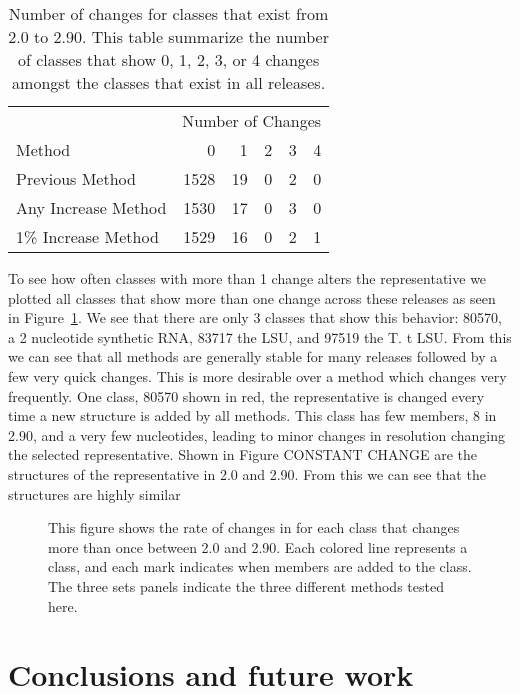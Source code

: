 \begin{table}
  \begin{tabular}{lrrrrr}
    \toprule
                        & \multicolumn{5}{c}{Number of Changes} \\
    Method              & 0    & 1  &  2 &  3 &  4 \\
    \midrule
    Previous Method     & 1528 & 19 &  0 &  2 &  0 \\
    Any Increase Method & 1530 & 17 &  0 &  3 &  0 \\
    1\% Increase Method & 1529 & 16 &  0 &  2 &  1 \\
    \bottomrule
  \end{tabular}
  \caption{Number of changes for classes that exist from 2.0 to 2.90. This table
    summarize the number of classes that show 0, 1, 2, 3, or 4 changes amongst
  the classes that exist in all releases. }
  \label{tab:rep-changes-count}
\end{table}

To see how often classes with more than 1 change alters the representative we
plotted all classes that show more than one change across these releases as seen
in Figure~\ref{fig:multi-change}. We see that there are only 3 classes that show
this behavior: 80570, a 2 nucleotide synthetic RNA, 83717 the \EC{} LSU, and
97519 the T. t LSU. From this we can see that all methods are generally stable
for many releases followed by a few very quick changes. This is more
desirable over a method which changes very frequently. One class, 80570
shown in red, the representative is changed every time a new structure is
added by all methods. This class has few members, 8 in 2.90, and a very
few nucleotides, leading to minor changes in resolution changing the
selected representative. Shown in Figure CONSTANT CHANGE are the
structures of the representative in 2.0 and 2.90. From this we can see
that the structures are highly similar

\begin{figure}
  \caption{This figure shows the rate of changes in for each class that changes
    more than once between 2.0 and 2.90. Each colored line represents a class,
    and each mark indicates when members are added to the class. The three sets
  panels indicate the three different methods tested here.}
  \label{fig:multi-change}
\end{figure}

\section{Conclusions and future work}

